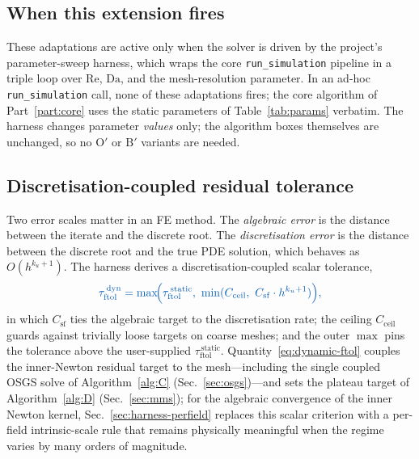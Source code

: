 \documentclass{article}
\newcommand{\code}[1]{\texttt{\small #1}}
\newcommand{\textftol}{\tau_{\mathrm{ftol}}}
\newcommand{\extline}[1]{{\color{extcolor}#1}}
\begin{document}
\subsection{When this extension fires}

\extline{These adaptations are active only when the solver is driven by
the project's parameter-sweep harness, which wraps the core
\code{run\_simulation} pipeline in a triple loop over $\mathrm{Re}$,
$\mathrm{Da}$, and the mesh-resolution parameter. In an ad-hoc
\code{run\_simulation} call, none of these adaptations fires; the core
algorithm of Part~\ref{part:core} uses the static parameters of
Table~\ref{tab:params} verbatim. The harness changes parameter
\emph{values} only; the algorithm boxes themselves are unchanged, so
no $\mathrm{O}'$ or $\mathrm{B}'$ variants are needed.}

\subsection{Discretisation-coupled residual tolerance}
\label{sec:harness-ftol}

\extline{Two error scales matter in an FE method. The \emph{algebraic
error} is the distance between the iterate and the discrete root.
The \emph{discretisation error} is the distance between the discrete
root and the true PDE solution, which behaves as $O(h^{k_u+1})$.
The harness derives a discretisation-coupled scalar tolerance,}
\begin{equation}
    \label{eq:dynamic-ftol}
    \textcolor{extcolor}{\textftol^{\,\mathrm{dyn}}
    = \max\!\Bigl(\textftol^{\,\mathrm{static}},\
        \min(C_{\mathrm{ceil}},\ C_{\mathrm{sf}} \cdot h^{k_u+1}) \Bigr),}
\end{equation}
\extline{in which $C_{\mathrm{sf}}$ ties the algebraic target to the
discretisation rate; the ceiling $C_{\mathrm{ceil}}$ guards against
trivially loose targets on coarse meshes; and the outer $\max$ pins
the tolerance above the user-supplied $\textftol^{\,\mathrm{static}}$.
Quantity~\eqref{eq:dynamic-ftol} couples the inner-Newton residual
target to the mesh---including the single coupled OSGS solve of
Algorithm~\ref{alg:C} (Sec.~\ref{sec:osgs})---and sets the plateau target
of Algorithm~\ref{alg:D} (Sec.~\ref{sec:mms}); for the
algebraic convergence of the inner Newton kernel,
Sec.~\ref{sec:harness-perfield} replaces this scalar criterion with a
per-field intrinsic-scale rule that remains physically meaningful when
the regime varies by many orders of magnitude.}
\end{document}
